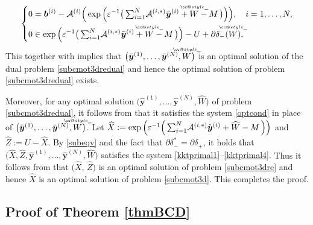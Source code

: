 \documentclass[10pt]{article}
\makeatletter
\def \widebar{\accentset{{\cc@style\underline{\mskip10mu}}}}
\newcommand{\cA}{{\cal A}}
\makeatother
\begin{document}
\begin{appendices}
\begin{equation}
\left\{\begin{aligned}
0 &= \bm{b}^{(i)} - \cA^{(i)}\Big( \exp\Big( \varepsilon^{-1} \big(\,{\textstyle\sum_{i=1}^N} \cA^{(i,*)}\bar{\bm{y}}^{(i)}
+\widebar{W}-M\,\big{)}\Big) \Big), \quad i=1,\dots,N, \\
0 &\in \exp\Big{(}\varepsilon^{-1} \big{(}\,{\textstyle\sum_{i=1}^N } \cA^{(i,*)}\bar{\bm{y}}^{(i)}
+\widebar{W}-M\,\big{)}\Big{)}
- U + \partial\delta_{-}(\widebar{W}).
\end{aligned}\right.
\end{equation}
This together with \cite[Theorem 3.5]{r2006nonlinear} implies that $\big{(}\bar{\bm{y}}^{(1)},\dots,\bar{\bm{y}}^{(N)},\widebar{W}\big{)}$ is an optimal solution of the dual problem \eqref{subcmot3dredual} and hence the optimal solution of problem \eqref{subcmot3dredual} exists.

Moreover, for any optimal solution $\big(\hat{\bm{y}}^{(1)},\dots,\hat{\bm{y}}^{(N)},\widehat{W}\big)$ of problem \eqref{subcmot3dredual}, it follows from \cite[Theorem 3.5]{r2006nonlinear} that it satisfies the system \eqref{optcond} in place of $\big{(}\bar{\bm{y}}^{(1)},\dots,\bar{\bm{y}}^{(N)},\widebar{W}\big{)}$. Let {$\widehat{X} := \exp\Big(\varepsilon^{-1} \Big(\, {\textstyle\sum_{i = 1}^N} \cA^{(i,*)}\hat{\bm{y}}^{(i)}+\widehat{W}-M\,\Big)\Big)$ and $\widehat{Z} := U - \widehat{X}$. By \eqref{subeqv} and the fact that $\partial\delta_{-}^* = \partial\delta_{+}$, it holds that  $\big(\widehat{X},\widehat{Z},\hat{\bm{y}}^{(1)},\dots,\hat{\bm{y}}^{(N)},\widehat{W} \big)$ satisfies the system \eqref{kktprimal1}--\eqref{kktprimal4}.} Thus it follows from \cite[Theorem 3.27]{r2006nonlinear} that $\big(\widehat{X},\,\widehat{Z}\big)$ is an optimal solution of problem \eqref{subcmot3dre} and hence $\widehat{X}$ is an optimal solution of problem \eqref{subcmot3d}. This completes the proof.



\subsection{Proof of Theorem \ref{thmBCD}}\label{apd-BCD-proof2}


\end{appendices}
\end{document}
